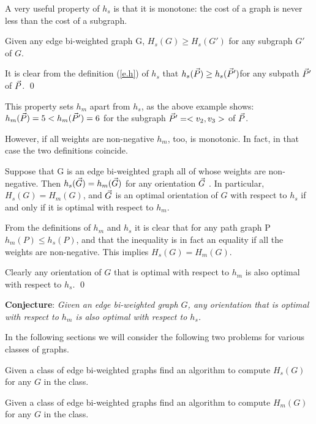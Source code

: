 A very useful property of $h_s$ is that it is monotone: the cost of a graph is never less than the cost of a subgraph.
\begin{lemma}\label{lem:sprop}
	Given any edge bi-weighted graph G,
	$H_{s}(G)\geq  H_{s}(G')$ for any subgraph $G'$ of $G$. 
\end{lemma}

It is clear from the definition (\ref{e.h}) of $h_s$ that $h_s(\vec{P})\geq h_s(\vec{P} ')$for any subpath 
$\vec{P} '$ of $\vec{P}$.  
\qed

This property sets $h_m$ apart from $h_s$,  as the above example shows:
$h_{m}(\vec{P})=5 <  h_{m}(\vec{P}')=6$ for the subgraph $\vec{P} '=<v_2,v_3>$ of $\vec{P}$.

However, if all weights are non-negative $h_m$, too, is monotonic. In fact, in that case the two definitions coincide.

\begin{lemma}
	Suppose that G is an edge bi-weighted graph  all of whose weights are non-negative.
	Then $h_{s}( \vec{G} )= h_{m}( \vec{G} )$ for any orientation $\vec{G}$
.
	In particular,  $H_{s}(G)= H_{m}(G)$,  and 
	$\vec{G}$ is an optimal orientation of $G$ with respect to $h_{s}$
	if and only if it is optimal with respect to $ h_{m} $.
\end{lemma}
From the definitions of $h_m$ and $h_s$ it is clear that for any path graph P  $h_{m}(P)\leq  h_{s}(P)$, and that the inequality is in fact an equality if all the weights 
are non-negative. This implies $H_{s}(G)= H_{m}(G)$.

Clearly any orientation of $G$ that is optimal with respect to $h_m$ is also 
optimal with respect to $h_s$. 
\qed

\bigskip
{\bf Conjecture}:
\textit{Given an edge bi-weighted graph $G$, any orientation that is optimal with 
	respect to $h_{m}$ is also optimal with respect to $h_{s} $.}

\bigskip
In the following sections we will consider the following two problems
for various classes of graphs.

\begin{problem}[
	HS]
	Given a class of edge bi-weighted graphs find an algorithm to compute
	$H_s(G) $
	for any $G$
	in the class.
\end{problem}

\begin{problem}[
	HM]
	Given a class of edge bi-weighted graphs find an algorithm to compute $H_m(G) $
	for any $G$
	in the class.
\end{problem}
